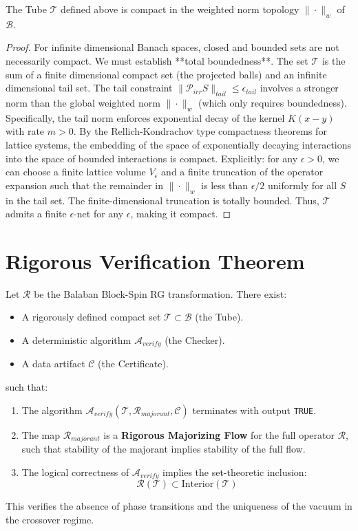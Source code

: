 \begin{lemma}
\label{lem:tube_compactness}
The Tube $\mathcal{T}$ defined above is compact in the weighted norm topology $\|\cdot\|_w$ of $\mathcal{B}$.
\end{lemma}
\begin{proof}
For infinite dimensional Banach spaces, closed and bounded sets are not necessarily compact. We must establish **total boundedness**.
The set $\mathcal{T}$ is the sum of a finite dimensional compact set (the projected balls) and an infinite dimensional tail set.
The tail constraint $\|\mathcal{P}_{irr} S\|_{tail} \le \epsilon_{tail}$ involves a stronger norm than the global weighted norm $\|\cdot\|_w$ (which only requires boundedness). Specifically, the tail norm enforces exponential decay of the kernel $K(x-y)$ with rate $m > 0$.
By the Rellich-Kondrachov type compactness theorems for lattice systems, the embedding of the space of exponentially decaying interactions into the space of bounded interactions is compact. 
Explicitly: for any $\epsilon > 0$, we can choose a finite lattice volume $V_\epsilon$ and a finite truncation of the operator expansion such that the remainder in $\|\cdot\|_w$ is less than $\epsilon/2$ uniformly for all $S$ in the tail set. The finite-dimensional truncation is totally bounded.
Thus, $\mathcal{T}$ admits a finite $\epsilon$-net for any $\epsilon$, making it compact.
\end{proof}

\section{Rigorous Verification Theorem}

\begin{theorem}
\label{thm:crossover_contraction}
Let $\mathcal{R}$ be the Balaban Block-Spin RG transformation. There exist:
\begin{itemize}
    \item A rigorously defined compact set $\mathcal{T} \subset \mathcal{B}$ (the Tube).
    \item A deterministic algorithm $\mathcal{A}_{verify}$ (the Checker).
    \item A data artifact $\mathcal{C}$ (the Certificate).
\end{itemize}
such that:
\begin{enumerate}
    \item The algorithm $\mathcal{A}_{verify}(\mathcal{T}, \mathcal{R}_{majorant}, \mathcal{C})$ terminates with output \texttt{TRUE}.
    \item The map $\mathcal{R}_{majorant}$ is a \textbf{Rigorous Majorizing Flow} for the full operator $\mathcal{R}$, such that stability of the majorant implies stability of the full flow.
    \item The logical correctness of $\mathcal{A}_{verify}$ implies the set-theoretic inclusion:
    \[ \mathcal{R}(\mathcal{T}) \subset \text{Interior}(\mathcal{T}) \]
\end{enumerate}
This verifies the absence of phase transitions and the uniqueness of the vacuum in the crossover regime.
\end{theorem}

